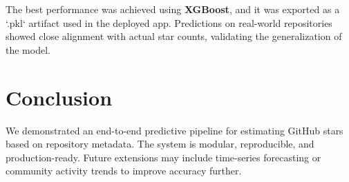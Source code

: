 \documentclass[12pt,a4paper]{article}
\begin{document}
The best performance was achieved using \textbf{XGBoost}, and it was exported as a `.pkl` artifact used in the deployed app. Predictions on real-world repositories showed close alignment with actual star counts, validating the generalization of the model.

\section{Conclusion}
We demonstrated an end-to-end predictive pipeline for estimating GitHub stars based on repository metadata. The system is modular, reproducible, and production-ready. Future extensions may include time-series forecasting or community activity trends to improve accuracy further.
\end{document}
